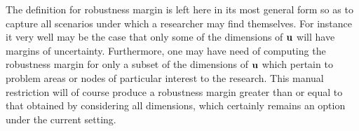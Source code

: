 The definition for robustness margin is left here in its most general form so as to capture all scenarios under which a researcher may find themselves. 
For instance it very well may be the case that only some of the dimensions of $\bold u$ will have margins of uncertainty. 
Furthermore, one may have need of computing the robustness margin for only a subset of the dimensions of $\bold u$ which pertain to problem areas or nodes of particular interest to the research. 
This manual restriction will of course produce a robustness margin greater than or equal to that obtained by considering all dimensions, which certainly remains an option under the current setting. 
